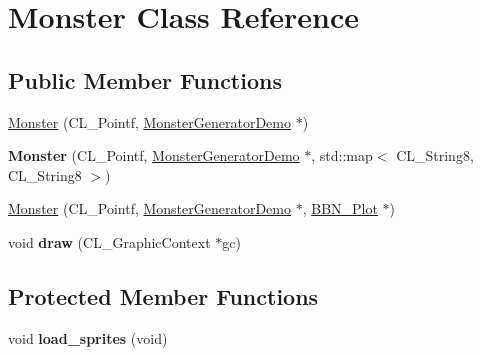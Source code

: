 \hypertarget{classMonster}{
\section{Monster Class Reference}
\label{classMonster}
}
\subsection*{Public Member Functions}
\begin{DoxyCompactItemize}
\item 
\hyperlink{classMonster_af4dbf8422477e5d7a8c8639ed8a6e7a7}{Monster} (CL\_\-Pointf, \hyperlink{classMonsterGeneratorDemo}{MonsterGeneratorDemo} $\ast$)
\item 
\hypertarget{classMonster_a6de8e0eb90db5e6005dd7e26dc37cf04}{
{\bfseries Monster} (CL\_\-Pointf, \hyperlink{classMonsterGeneratorDemo}{MonsterGeneratorDemo} $\ast$, std::map$<$ CL\_\-String8, CL\_\-String8 $>$)}
\label{classMonster_a6de8e0eb90db5e6005dd7e26dc37cf04}

\item 
\hyperlink{classMonster_a1b3329ad00743bd5432d81ee487ca7ae}{Monster} (CL\_\-Pointf, \hyperlink{classMonsterGeneratorDemo}{MonsterGeneratorDemo} $\ast$, \hyperlink{classBBN__Plot}{BBN\_\-Plot} $\ast$)
\item 
\hypertarget{classMonster_aaf16974cdf557c0e62e445c94ddcfc53}{
void {\bfseries draw} (CL\_\-GraphicContext $\ast$gc)}
\label{classMonster_aaf16974cdf557c0e62e445c94ddcfc53}

\end{DoxyCompactItemize}
\subsection*{Protected Member Functions}
\begin{DoxyCompactItemize}
\item 
\hypertarget{classMonster_a3e1c502f98e13fef189adb45631f4ca2}{
void {\bfseries load\_\-sprites} (void)}
\label{classMonster_a3e1c502f98e13fef189adb45631f4ca2}

\end{DoxyCompactItemize}
